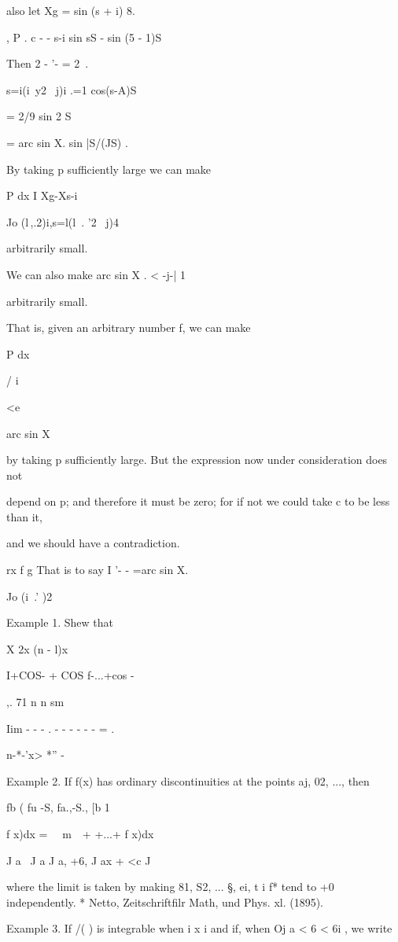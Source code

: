 also let Xg = sin (s + i) 8.

, P . c - - s-i sin sS - sin (5 - 1)S

Then 2 - '- = 2 \,.

s=i(i\ y2 \ j)i .=1 cos(s-A)S

= 2/9 sin 2 S

= arc sin X. sin |S/(JS) .

By taking p sufficiently large we can make

P dx I Xg-Xs-i

Jo (l\,,.2)i,s=l(l\ . '2 \ j)4

arbitrarily small.

We can also make arc sin X . < -j-| 1

arbitrarily small.

That is, given an arbitrary number f, we can make

P dx

/ i~

<e

arc sin X

by taking p sufficiently large. But the expression now under
consideration does not

depend on p; and therefore it must be zero; for if not we could take
c to be less than it,

and we should have a contradiction.

rx f g That is to say I '- - =arc sin X.

Jo (i\ .' )2

Example 1. Shew that

X 2x (n - l)x

I+COS- + COS f-...+cos -

,. 71 n n sm

Iim - - - . - - - - - - = .

n-*-'x> *'' -

Example 2. If f(x) has ordinary discontinuities at the points aj, 02,
..., then

fb ( fu -S, fa.,-S., [b 1

f x)dx = \ \ m\ \ + +...+ f x)dx\,

J a \ J a J a, +6, J ax + <c J

where the limit is taken by making 81, S2, ... §, ei, t i  f* tend
to +0 independently. * Netto, Zeitschriftfilr Math, und Phys. xl.
(1895).

%
%

Example 3. If /( ) is integrable when i x i and if, when Oj a < 6 < 6i
, we write

